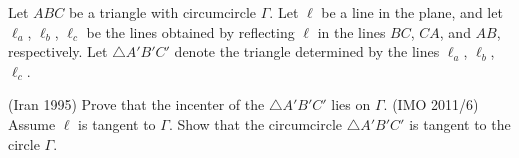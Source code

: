 \documentclass[11pt]{scrartcl}
\begin{document}
\begin{problem}
	Let $ABC$ be a triangle with circumcircle $\Gamma$.
	Let $\ell$ be a line in the plane, and let $\ell_a$, $\ell_b$, $\ell_c$ be the lines obtained
	by reflecting $\ell$ in the lines $BC$, $CA$, and $AB$, respectively.
	Let $\triangle A'B'C'$ denote the triangle determined by the lines $\ell_a$, $\ell_b$, $\ell_c$.
	\begin{enumerate}[(a)]
		\ii (Iran 1995) Prove that the incenter of the $\triangle A'B'C'$ lies on $\Gamma$.
		\ii (IMO 2011/6) Assume $\ell$ is tangent to $\Gamma$.
		Show that the circumcircle $\triangle A'B'C'$ is tangent to the circle $\Gamma$.
	\end{enumerate}
\end{problem}
\end{document}
